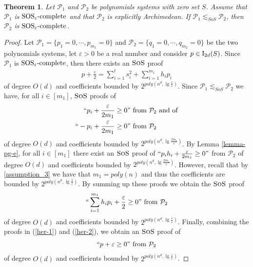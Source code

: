 \documentclass[11pt]{article}
\newcommand{\sos}{\text{\sc{SoS}}}
\newcommand{\I}{\emph{$\rm{I}$}}
\newcommand{\1}{\textbf{1}}
\newtheorem{theorem}{Theorem}[section]
\newcommand{\SOSe}{\rm{SOS}_\varepsilon\text{-complete}}
\begin{document}
\begin{theorem}\label{th:richness_inheritance}
    Let $\mathcal{P}_1$ and $\mathcal{P}_2$ be polynomials systems with zero set $S$. Assume that $\mathcal P_1$ is $\SOSe$ and that $\mathcal{P}_2$ is explicitly Archimedean. If  $\mathcal{P}_1\lesssim_{SoS} \mathcal{P}_2$, then $\mathcal{P}_2$ is $\SOSe$. 
\end{theorem}
\begin{proof}
Let $\mathcal{P}_1=\{p_1 =0, \cdots, p_{m_1}=0\}$ and $\mathcal{P}_2=\{q_1=0, \cdots, q_{m_2}=0\}$ be the two polynomials systems, let $\varepsilon>0$ be a real number and consider $p\in \I_{2d}(S)$. Since $\mathcal{P}_1$ is $\SOSe$, then there exists an $\sos$ proof 
\begin{align}\label{her-1}
    p+\frac{\varepsilon}{2} = \sum_{i=1}^{t} s_i^2 + \sum_{i=1}^{m_1}h_ip_i
\end{align}
of degree $O(d)$ and coefficients bounded by $2^{poly(n^d, \lg \frac{1}{\varepsilon})}$.
Since $\mathcal{P}_1\lesssim_{SoS} \mathcal{P}_2$ we have, for all $i\in [m_1]$, $\sos$ proofs of
\begin{align*}
``p_i+\frac{\varepsilon}{2m_1} \geq 0&" \text{ from } \mathcal{P}_2 \text{ and of} \\
``-p_i+\frac{\varepsilon}{2m_1} \geq 0&" \text{ from } \mathcal{P}_2
\end{align*}
of degree $O(d)$ and coefficients bounded by $2^{poly(n^d, \lg \frac{2m_1}{\varepsilon})}$. By Lemma \ref{lemma-pg-e}, for all $i\in [m_1]$ there exist an $\sos$ proof of $``p_ih_i + \frac{\varepsilon}{2m_1}\geq 0"$ from $\mathcal{P}_2$ of degree $O(d)$ and coefficients bounded by $2^{poly(n^d, \lg\frac{2m_1}{\varepsilon})}$. However, recall that by \ref{assumption_3} we have that $m_1 = poly(n)$ and thus the coefficients are bounded by $2^{poly(n^d, \lg \frac{1}{\varepsilon})}$. By summing up these proofs we obtain the $\sos$ proof
\begin{align}\label{her-2}
    ``\sum_{i=1}^{m_1}h_ip_i + \frac{\varepsilon}{2} \geq 0" \text{ from } \mathcal{P}_2
\end{align}
of degree $O(d)$ and coefficients bounded by $2^{poly(n^d, \lg\frac{1}{\varepsilon})}$. Finally, combining the proofs in (\ref{her-1}) and (\ref{her-2}), we obtain an $\sos$ proof of 
$$``p+\varepsilon \geq 0" \text{ from } \mathcal{P}_2$$
of degree $O(d)$ and coefficients bounded by $2^{poly(n^d, \lg\frac{1}{\varepsilon})}$.
\end{proof}
\end{document}
